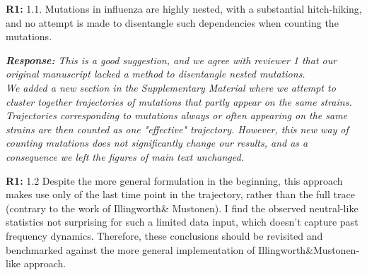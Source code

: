 \documentclass[aps,rmp,onecolumn]{revtex4-1}
\newcommand{\refa}[1]{\textbf{R1:} #1\vskip 5mm}
\newcommand{\response}[1]{{\it {\color{response}\textbf{Response:} #1}}\vskip 5mm}
\begin{document}
\refa{1.1. Mutations in influenza are highly nested, with a substantial
hitch-hiking, and no attempt is made to disentangle such dependencies when counting the mutations.}

\response{This is a good suggestion, and we agree with reviewer 1 that our original manuscript lacked a method to disentangle nested mutations. \\
We added a new section in the Supplementary Material where we attempt to cluster together trajectories of mutations that partly appear on the same strains. 
Trajectories corresponding to mutations always or often appearing on the same strains are then counted as one "effective" trajectory. 
However, this new way of counting mutations does not significantly change our results, and as a consequence we left the figures of main text unchanged.}

\refa{1.2 Despite the more general formulation in the beginning, this
approach makes use only of the last time point in the trajectory,
rather than the full trace (contrary to the work of Illingworth\&
Mustonen). I find the observed neutral-like statistics not surprising
for such a limited data input, which doesn't capture past frequency dynamics. Therefore, these conclusions should be
revisited and benchmarked against the more general implementation of Illingworth\&Mustonen-like approach.}
\end{document}
